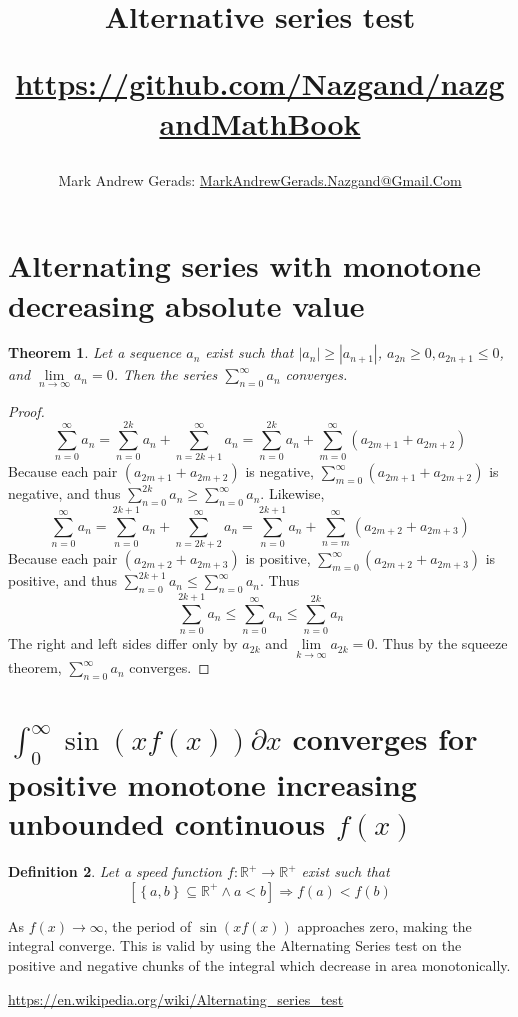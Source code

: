 \documentclass[]{article}
\author{Mark Andrew Gerads: \href{MailTo:MarkAndrewGerads.Nazgand@Gmail.Com}{MarkAndrewGerads.Nazgand@Gmail.Com}}
\title{
	Alternative series test
	
	\href{https://github.com/Nazgand/nazgandMathBook}{https://github.com/Nazgand/nazgandMathBook}
}
\newcommand{\pqty}[1]{{\left(#1\right)}}
\newcommand{\Bqty}[1]{{\left\{#1\right\}}}
\newcommand{\bqty}[1]{{\left[#1\right]}}
\newcommand{\abs}[1]{{\left\lvert#1\right\rvert}}
\newtheorem{theorem}{Theorem}[section]
\newtheorem{definition}[theorem]{Definition}
\numberwithin{equation}{section}
\begin{document}
	
	\maketitle
	\section{Alternating series with monotone decreasing absolute value}
	
	\begin{theorem}
		Let a sequence \(a_n\) exist such that \(\abs{a_n}\geq\abs{a_{n+1}}\), \(a_{2n}\geq 0,a_{2n+1}\leq 0\), and \(\lim\limits_{n\to\infty}a_n=0\). Then the series \(\sum_{n=0}^{\infty}a_n\) converges.
	\end{theorem}
	\begin{proof}
		\begin{equation}
			\sum_{n=0}^{\infty}a_n
			=
			\sum_{n=0}^{2k}a_n+\sum_{n=2k+1}^{\infty}a_n
			=
			\sum_{n=0}^{2k}a_n+\sum_{m=0}^{\infty}\pqty{a_{2m+1}+a_{2m+2}}
		\end{equation}
		Because each pair \(\pqty{a_{2m+1}+a_{2m+2}}\) is negative, \(\sum_{m=0}^{\infty}\pqty{a_{2m+1}+a_{2m+2}}\) is negative, and thus \(\sum_{n=0}^{2k}a_n\geq \sum_{n=0}^{\infty}a_n\). Likewise,
		\begin{equation}
		\sum_{n=0}^{\infty}a_n
		=
		\sum_{n=0}^{2k+1}a_n+\sum_{n=2k+2}^{\infty}a_n
		=
		\sum_{n=0}^{2k+1}a_n+\sum_{n=m}^{\infty}\pqty{a_{2m+2}+a_{2m+3}}
		\end{equation}
		Because each pair \(\pqty{a_{2m+2}+a_{2m+3}}\) is positive, \(\sum_{m=0}^{\infty}\pqty{a_{2m+2}+a_{2m+3}}\) is positive, and thus \(\sum_{n=0}^{2k+1}a_n\leq \sum_{n=0}^{\infty}a_n\). Thus
		\begin{equation}
			\sum_{n=0}^{2k+1}a_n\leq
			\sum_{n=0}^{\infty}a_n\leq
			\sum_{n=0}^{2k}a_n
		\end{equation}
		The right and left sides differ only by \(a_{2k}\) and \(\lim\limits_{k\to\infty}a_{2k}=0\). Thus by the squeeze theorem, \(\sum_{n=0}^{\infty}a_n\) converges.
	\end{proof}
	
	\section{\(\int_{0}^{\infty}\sin\pqty{xf\pqty{x}}\partial x\) converges for positive monotone increasing unbounded continuous \(f\pqty{x}\)}
	\begin{definition}
		Let a speed function \(f:\mathbb{R}^+\to\mathbb{R}^+\) exist such that
		\begin{equation}
		\bqty{\Bqty{a,b}\subseteq\mathbb{R}^+\land a<b}
		\Rightarrow
		f\pqty{a}<f\pqty{b}
		\end{equation}
	\end{definition}

	As \(f\pqty{x}\to\infty\), the period of \(\sin\pqty{xf\pqty{x}}\) approaches zero, making the integral converge. This is valid by using the Alternating Series test on the positive and negative chunks of the integral which decrease in area monotonically.
	
	\url{https://en.wikipedia.org/wiki/Alternating_series_test}
	
\end{document}
